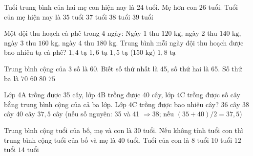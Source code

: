 \begin{ex} %
Tuổi trung bình của hai mẹ con hiện nay là 24 tuổi. Mẹ hơn con 26 tuổi. Tuổi của mẹ hiện nay là
\choice
{$35$ tuổi}
{\True $37$ tuổi}
{$38$ tuổi}
{$39$ tuổi}
\end{ex}

\begin{ex} %
Một đội thu hoạch cà phê trong 4 ngày: Ngày 1 thu $120\text{ kg}$, ngày 2 thu $140\text{ kg}$, ngày 3 thu $160\text{ kg}$, ngày 4 thu $180\text{ kg}$. Trung bình mỗi ngày đội thu hoạch được bao nhiêu tạ cà phê?
\choice
{$1{,}4\text{ tạ}$}
{$1{,}6\text{ tạ}$}
{\True $1{,}5\text{ tạ}$ ($150\text{ kg}$)}
{$1{,}8\text{ tạ}$}
\end{ex}

\begin{ex} %
Trung bình cộng của 3 số là 60. Biết số thứ nhất là 45, số thứ hai là 65. Số thứ ba là
\choice
{\True $70$}
{$60$}
{$80$}
{$75$}
\end{ex}

\begin{ex} %
Lớp 4A trồng được 35 cây, lớp 4B trồng được 40 cây, lớp 4C trồng được số cây bằng trung bình cộng của cả ba lớp. Lớp 4C trồng được bao nhiêu cây?
\choice
{$36$ cây}
{$38$ cây}
{$40$ cây}
{\True $37{,}5$ cây (nếu số nguyên: 35 và 41 $\Rightarrow 38$; nếu $(35+40)/2 = 37{,}5$)}
\end{ex}

\begin{ex} %
Trung bình cộng tuổi của bố, mẹ và con là 30 tuổi. Nếu không tính tuổi con thì trung bình cộng tuổi của bố và mẹ là 40 tuổi. Tuổi của con là
\choice
{$8$ tuổi}
{\True $10$ tuổi}
{$12$ tuổi}
{$14$ tuổi}
\end{ex}

